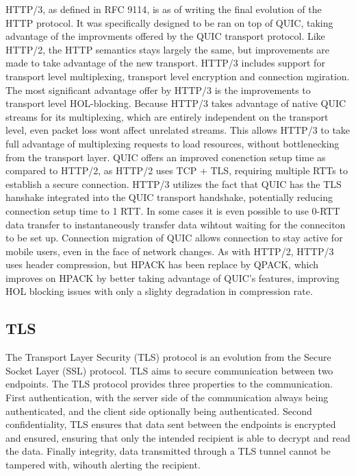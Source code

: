 \documentclass[english, 12pt, a4paper, elec, utf8, a-2b, online]{aaltothesis}
\begin{document}
HTTP/3, as defined in RFC 9114\cite{rfc9114}, is as of writing the final evolution
of the HTTP protocol. It was specifically designed to be ran on top of QUIC,
taking advantage of the improvments offered by the QUIC transport protocol. Like HTTP/2,
the HTTP semantics stays largely the same, but improvements are made to take advantage
of the new transport. HTTP/3 includes support for transport level multiplexing,
transport level encryption and connection mgiration. The most significant advantage
offer by HTTP/3 is the improvements to transport level HOL-blocking. Because HTTP/3
takes advantage of native QUIC streams for its multiplexing, which are entirely independent
on the transport level, even packet loss wont affect unrelated streams. This allows
HTTP/3 to take full advantage of multiplexing requests to load resources, without
bottlenecking from the transport layer. QUIC offers an improved conenction setup
time as compared to HTTP/2, as HTTP/2 uses TCP + TLS, requiring multiple RTTs to
establish a secure connection. HTTP/3 utilizes the fact that QUIC has the TLS
hanshake integrated into the QUIC transport handshake, potentially reducing
connection setup time to 1 RTT. In some cases it is even possible to use 0-RTT
data transfer to instantaneously transfer data wihtout waiting for the conneciton
to be set up. Connection migration of QUIC allows connection to stay active for mobile
users, even in the face of network changes\cite{rfc9114}. As with HTTP/2, HTTP/3 uses header compression,
but HPACK has been replace by QPACK, which improves on HPACK by better taking advantage
of QUIC's features, improving HOL blocking issues with only a slighty degradation
in compression rate\cite{rfc9204}.


\subsection{TLS}
\label{sec:tls}
The Transport Layer  Security (TLS) protocol is an evolution from the Secure Socket Layer (SSL)\cite{rfc6101} protocol.
TLS aims to secure communication between two endpoints. The TLS protocol provides three
properties to the communication. First authentication, with the server side of the
communication always being authenticated, and the client side optionally being
authenticated. Second confidentiality, TLS ensures that data sent between the
endpoints is encrypted and ensured, ensuring that only the intended recipient is
able to decrypt and read the data. Finally integrity, data transmitted through
a TLS tunnel cannot be tampered with, wihouth alerting the recipient\cite{rfc8446}.
\end{document}
